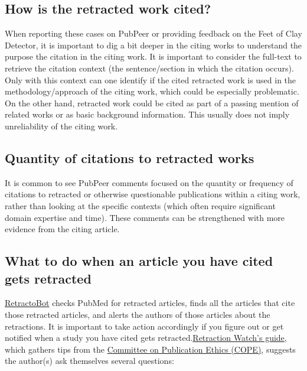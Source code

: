 \documentclass[letterpaper, 12pt]{article}
\begin{document}
\subsection*{How is the retracted work cited?}

When reporting these cases on PubPeer or providing feedback on the Feet of Clay Detector, it is important to dig a bit deeper in the citing works to understand the purpose the citation in the citing work. It is important to consider the full-text to retrieve the citation context (the sentence/section in which the citation occurs). Only with this context can one identify if the cited retracted work is used in the methodology/approach of the citing work, which could be especially problematic. On the other hand, retracted work could be cited as part of a passing mention of related works or as basic background information. This usually does not imply unreliability of the citing work. 

\subsection*{Quantity of citations to retracted works}

It is common to see PubPeer comments focused on the quantity or frequency of citations to retracted or otherwise questionable publications within a citing work, rather than looking at the specific contexts (which often require significant domain expertise and time). These comments can be strengthened with more evidence from the citing article. 

\subsection*{What to do when an article you have cited gets retracted}

\href{https://www.retracted.net/}{RetractoBot} checks PubMed for retracted articles, finds all the articles that cite those retracted articles, and alerts the authors of those articles about the retractions. It is important to take action accordingly if you figure out or get notified when a study you have cited gets retracted.\href{https://retractionwatch.com/2016/11/01/what-should-you-do-if-a-paper-youve-cited-is-later-retracted/}{Retraction Watch's guide}, which gathers tips from the \href{https://publicationethics.org/guidance/case/citing-retracted-paper}{Committee on Publication Ethics (COPE)}, suggests the author(s) ask themselves several questions:
\end{document}
